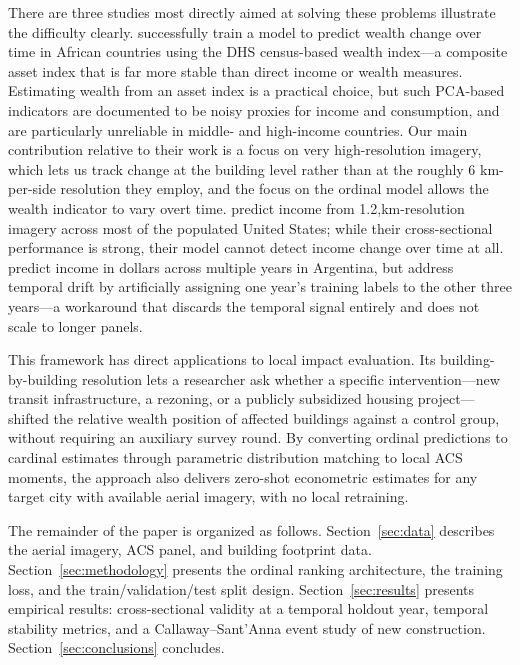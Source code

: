 \documentclass[conference]{IEEEtran}
\begin{document}
There are three studies most directly aimed at solving these problems illustrate the difficulty clearly. \citet{Zheng2025} successfully train a model to predict wealth change over time in African countries using the DHS census-based wealth index---a composite asset index that is far more stable than direct income or wealth measures. Estimating wealth from an asset index is a practical choice, but such PCA-based indicators are documented to be noisy proxies for income and consumption, and are particularly unreliable in middle- and high-income countries. Our main contribution relative to their work is a focus on very high-resolution imagery, which lets us track change at the building level rather than at the roughly 6 km-per-side resolution they employ, and the focus on the ordinal model allows the wealth indicator to vary overt time. \citet{kachiyian2022} predict income from 1.2,km-resolution imagery across most of the populated United States; while their cross-sectional performance is strong, their model cannot detect income change over time at all. \citet{abbate2025longitudinal} predict income in dollars across multiple years in Argentina, but address temporal drift by artificially assigning one year's training labels to the other three years—a workaround that discards the temporal signal entirely and does not scale to longer panels.

This framework has direct applications to local impact evaluation. Its building-by-building resolution lets a researcher ask whether a specific intervention—new transit infrastructure, a rezoning, or a publicly subsidized housing project—shifted the relative wealth position of affected buildings against a control group, without requiring an auxiliary survey round. By converting ordinal predictions to cardinal estimates through parametric distribution matching to local ACS moments, the approach also delivers zero-shot econometric estimates for any target city with available aerial imagery, with no local retraining.

The remainder of the paper is organized as follows. Section~\ref{sec:data} describes the aerial imagery, ACS panel, and building footprint data. Section~\ref{sec:methodology} presents the ordinal ranking architecture, the training loss, and the train/validation/test split design. Section~\ref{sec:results} presents empirical results: cross-sectional validity at a temporal holdout year, temporal stability metrics, and a Callaway--Sant'Anna event study of new construction. Section~\ref{sec:conclusions} concludes.
\end{document}
